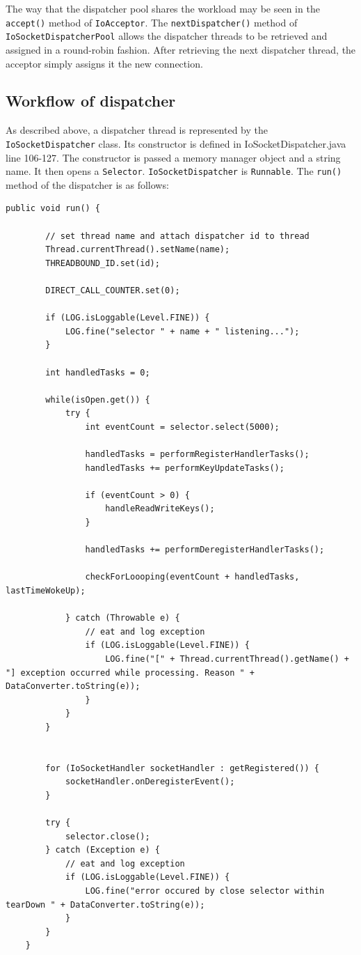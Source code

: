 \documentclass[letterpaper,12pt]{article}
\begin{document}
The way that the dispatcher pool shares the workload may be seen in the \texttt{accept()} method of \texttt{IoAcceptor}. The \texttt{nextDispatcher()} method of \texttt{IoSocketDispatcherPool} allows the dispatcher threads to be retrieved and assigned in a round-robin fashion. After retrieving the next dispatcher thread, the acceptor simply assigns it the new connection.

\subsection{Workflow of dispatcher}

As described above, a dispatcher thread is represented by the \texttt{IoSocketDispatcher} class. Its constructor is defined in IoSocketDispatcher.java line 106-127. The constructor is passed a memory manager object and a string name. It then opens a \texttt{Selector}. \texttt{IoSocketDispatcher} is \texttt{Runnable}. The \texttt{run()} method of the dispatcher is as follows:

\begin{lstlisting}[label=dispatcherLoop,caption=Main loop of dispatcher,firstnumber=208]
    public void run() {
        
        // set thread name and attach dispatcher id to thread
        Thread.currentThread().setName(name);
        THREADBOUND_ID.set(id);

        DIRECT_CALL_COUNTER.set(0);

        if (LOG.isLoggable(Level.FINE)) {
            LOG.fine("selector " + name + " listening...");
        }

        int handledTasks = 0;

        while(isOpen.get()) {
            try {
                int eventCount = selector.select(5000);

                handledTasks = performRegisterHandlerTasks();
                handledTasks += performKeyUpdateTasks();

                if (eventCount > 0) {
                    handleReadWriteKeys();
                }

                handledTasks += performDeregisterHandlerTasks();

                checkForLoooping(eventCount + handledTasks, lastTimeWokeUp);

            } catch (Throwable e) {
                // eat and log exception
                if (LOG.isLoggable(Level.FINE)) {
                    LOG.fine("[" + Thread.currentThread().getName() + "] exception occurred while processing. Reason " + DataConverter.toString(e));
                }
            }
        }
        

        for (IoSocketHandler socketHandler : getRegistered()) {
            socketHandler.onDeregisterEvent();
        }

        try {
            selector.close();
        } catch (Exception e) {
            // eat and log exception
            if (LOG.isLoggable(Level.FINE)) {
                LOG.fine("error occured by close selector within tearDown " + DataConverter.toString(e));
            }
        }
    }
\end{lstlisting}
\end{document}
